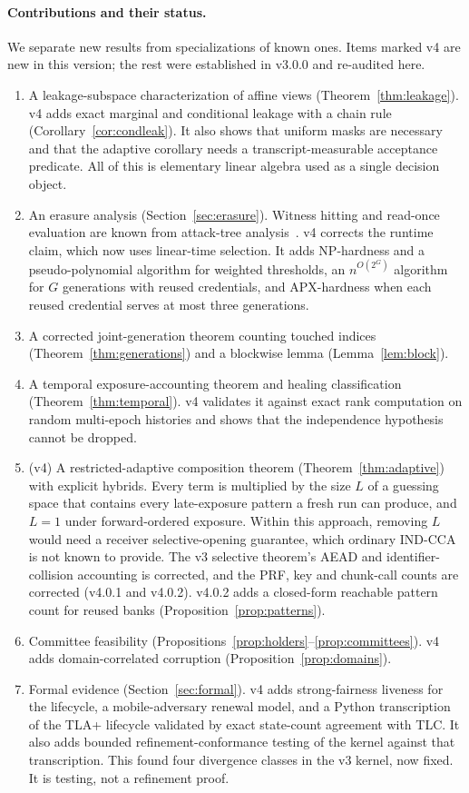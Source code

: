 \documentclass[pdflatex,sn-mathphys-num]{sn-jnl}
\theoremstyle{plain}
\theoremstyle{definition}
\begin{document}
\paragraph{Contributions and their status.}
We separate new results from specializations of known ones. Items marked v4 are new in this version; the rest were established in v3.0.0 and re-audited here.
\begin{enumerate}
\item A leakage-subspace characterization of affine views (Theorem~\ref{thm:leakage}). v4 adds exact marginal and conditional leakage with a chain rule (Corollary~\ref{cor:condleak}). It also shows that uniform masks are necessary and that the adaptive corollary needs a transcript-measurable acceptance predicate. All of this is elementary linear algebra used as a single decision object.
\item An erasure analysis (Section~\ref{sec:erasure}). Witness hitting and read-once evaluation are known from attack-tree analysis~\cite{mauw2005,lopuhaa2022}. v4 corrects the runtime claim, which now uses linear-time selection. It adds NP-hardness and a pseudo-polynomial algorithm for weighted thresholds, an $n^{O(2^G)}$ algorithm for $G$ generations with reused credentials, and APX-hardness when each reused credential serves at most three generations.
\item A corrected joint-generation theorem counting touched indices (Theorem~\ref{thm:generations}) and a blockwise lemma (Lemma~\ref{lem:block}).
\item A temporal exposure-accounting theorem and healing classification (Theorem~\ref{thm:temporal}). v4 validates it against exact rank computation on random multi-epoch histories and shows that the independence hypothesis cannot be dropped.
\item (v4) A restricted-adaptive composition theorem (Theorem~\ref{thm:adaptive}) with explicit hybrids. Every term is multiplied by the size $L$ of a guessing space that contains every late-exposure pattern a fresh run can produce, and $L=1$ under forward-ordered exposure. Within this approach, removing $L$ would need a receiver selective-opening guarantee, which ordinary IND-CCA is not known to provide. The v3 selective theorem's AEAD and identifier-collision accounting is corrected, and the PRF, key and chunk-call counts are corrected (v4.0.1 and v4.0.2). v4.0.2 adds a closed-form reachable pattern count for reused banks (Proposition~\ref{prop:patterns}).
\item Committee feasibility (Propositions~\ref{prop:holders}--\ref{prop:committees}). v4 adds domain-correlated corruption (Proposition~\ref{prop:domains}).
\item Formal evidence (Section~\ref{sec:formal}). v4 adds strong-fairness liveness for the lifecycle, a mobile-adversary renewal model, and a Python transcription of the TLA+ lifecycle validated by exact state-count agreement with TLC. It also adds bounded refinement-conformance testing of the kernel against that transcription. This found four divergence classes in the v3 kernel, now fixed. It is testing, not a refinement proof.
\end{enumerate}
\end{document}

